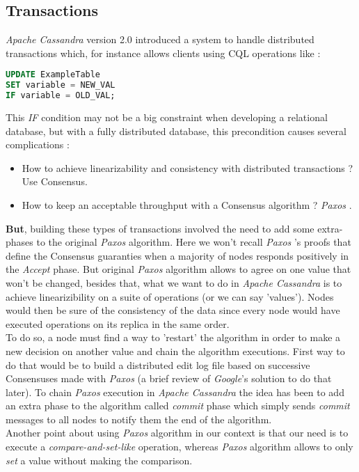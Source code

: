\documentclass[a4paper]{report}
\newcommand{\ca}{\emph{Apache Cassandra }}
\newcommand{\px}{\emph{Paxos }}
\begin{document}
\subsection{Transactions}
\ca version 2.0 introduced a system to handle distributed transactions which, for instance allows clients using CQL operations like :
\vspace{0.7cm}
\begin{lstlisting}[label=cql-ex-1, caption=CQL Update Example, language=SQL]
UPDATE ExampleTable
SET variable = NEW_VAL
IF variable = OLD_VAL;
\end{lstlisting}
\vspace{0.7cm}
This \emph{IF} condition may not be a big constraint when developing a relational database, but with a fully distributed database, this precondition causes several complications : 
\begin{itemize}
	\item How to achieve linearizability and consistency with distributed transactions ? Use Consensus.
	\item How to keep an acceptable throughput with a Consensus algorithm ? \px\cite{Lamport1}.
\end{itemize}
{\bfseries But}, building these types of transactions involved the need to add some extra-phases to the original \px algorithm. Here we won't recall \px's proofs that define the Consensus guaranties when a majority of nodes responds positively in the \emph{Accept} phase. But original \px algorithm allows to agree on one value that won't be changed, besides that, what we want to do in \ca is to achieve linearizibility on a suite of operations (or we can say 'values'). Nodes would then be sure of the consistency of the data since every node would have executed operations on its replica in the same order. \\
To do so, a node must find a way to 'restart' the algorithm in order to make a new decision on another value and chain the algorithm executions. First way to do that would be to build a distributed edit log file based on successive Consensuses made with \px (a brief review of \emph{Google}'s solution to do that later). To chain \px execution in \ca the idea has been to add an extra phase to the algorithm called \emph{commit} phase which simply sends \emph{commit} messages to all nodes to notify them the end of the algorithm.\\
Another point about using \px algorithm in our context is that our need is to execute a \emph{compare-and-set-like} operation, whereas \px algorithm allows to only \emph{set} a value without making the comparison. \\
\end{document}
